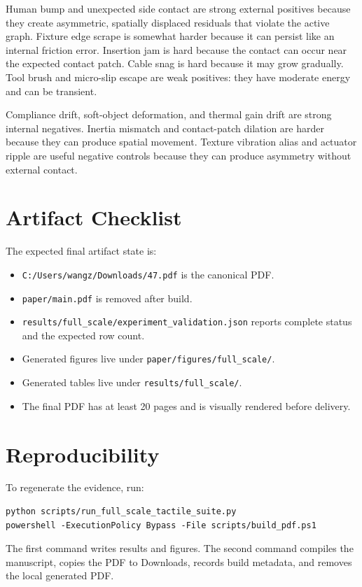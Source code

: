 \documentclass{article}
\begin{document}
Human bump and unexpected side contact are strong external positives because they create asymmetric, spatially displaced residuals that violate the active graph. Fixture edge scrape is somewhat harder because it can persist like an internal friction error. Insertion jam is hard because the contact can occur near the expected contact patch. Cable snag is hard because it may grow gradually. Tool brush and micro-slip escape are weak positives: they have moderate energy and can be transient.

Compliance drift, soft-object deformation, and thermal gain drift are strong internal negatives. Inertia mismatch and contact-patch dilation are harder because they can produce spatial movement. Texture vibration alias and actuator ripple are useful negative controls because they can produce asymmetry without external contact.

\section{Artifact Checklist}

The expected final artifact state is:
\begin{itemize}
\item \texttt{C:/Users/wangz/Downloads/47.pdf} is the canonical PDF.
\item \texttt{paper/main.pdf} is removed after build.
\item \texttt{results/full\_scale/experiment\_validation.json} reports complete status and the expected row count.
\item Generated figures live under \texttt{paper/figures/full\_scale/}.
\item Generated tables live under \texttt{results/full\_scale/}.
\item The final PDF has at least 20 pages and is visually rendered before delivery.
\end{itemize}

\section{Reproducibility}

To regenerate the evidence, run:
\begin{verbatim}
python scripts/run_full_scale_tactile_suite.py
powershell -ExecutionPolicy Bypass -File scripts/build_pdf.ps1
\end{verbatim}
The first command writes results and figures. The second command compiles the manuscript, copies the PDF to Downloads, records build metadata, and removes the local generated PDF.
\end{document}

